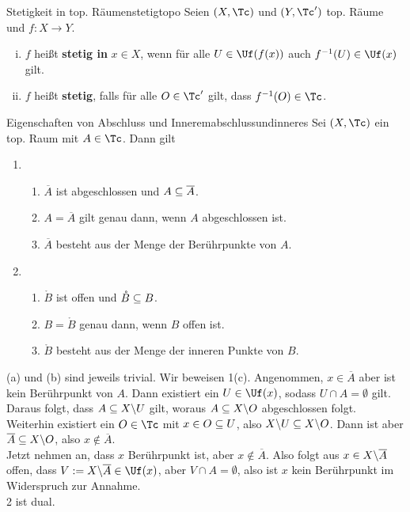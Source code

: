\begin{definition}{Stetigkeit in top. Räumen}{stetigtopo}
Seien $(X, \Tc)$ und $(Y, \Tc')$ top. Räume und $f: X \to Y$.
\begin{enumerate}[(i)]
\item $f$ heißt \textbf{stetig in} $x \in X$, wenn für alle $U \in \Uf(f(x))$ auch $f^{-1}(U) \in \Uf(x)$ gilt.
\item $f$ heißt \textbf{stetig}, falls für alle $O \in \Tc'$ gilt, dass $f^{-1} (O) \in \Tc$.
\end{enumerate}
\end{definition}
\begin{satz}{Eigenschaften von Abschluss und Innerem}{abschlussundinneres}
Sei $(X,\Tc)$ ein top. Raum mit $A \in \Tc$. Dann gilt
\begin{enumerate}
\item \begin{enumerate}
\item $\overline{A}$ ist abgeschlossen und $A \subseteq \overline{A}$.
\item $A = \overline{A}$ gilt genau dann, wenn $A$ abgeschlossen ist.
\item $\overline{A}$ besteht aus der Menge der Berührpunkte von $A$.
\end{enumerate}
\item \begin{enumerate}
\item $\mathring{B}$ ist offen und $\mathring{B} \subseteq B$.
\item $B = \mathring{B}$ genau dann, wenn $B$ offen ist.
\item $\mathring{B}$ besteht aus der Menge der inneren Punkte von $B$.
\end{enumerate}
\end{enumerate}
\end{satz}
\begin{beweis}
(a) und (b) sind jeweils trivial. Wir beweisen 1(c). Angenommen, $x \in \overline{A}$ aber ist kein Berührpunkt von $A$. Dann existiert ein $U \in \Uf(x)$, sodass $U \cap A = \emptyset$ gilt. Daraus folgt, dass $A \subseteq X \backslash U$ gilt, woraus $A \subseteq X \backslash O$ abgeschlossen folgt. Weiterhin existiert ein $O \in \Tc$ mit $x \in O \subseteq U$, also $X \backslash U \subseteq X \backslash O$. Dann ist aber $\overline{A} \subseteq X \backslash O$, also $x \notin \overline{A}$.\\
Jetzt nehmen an, dass $x$ Berührpunkt ist, aber $x \notin  \overline{A}$. Also folgt aus $x \in X \backslash \overline{A}$ offen, dass $V:= X \exc \overline{A} \in \Uf (x)$, aber $V \cap A = \emptyset$, also ist $x$ kein Berührpunkt im Widerspruch zur Annahme.\\
2 ist dual.
\end{beweis}
